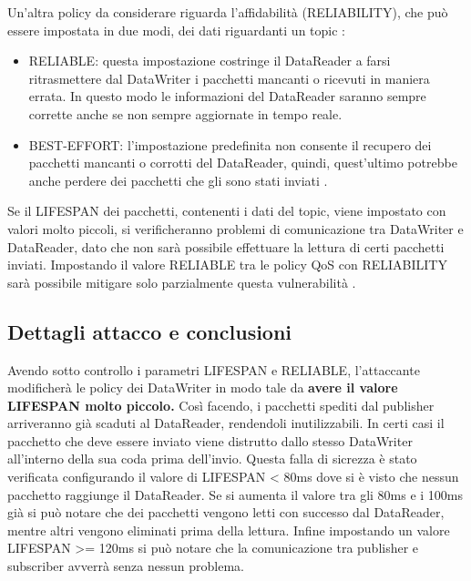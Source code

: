 Un'altra policy da considerare riguarda l'affidabilità (RELIABILITY),
che può essere impostata in due
modi, dei dati riguardanti un topic :
\begin{itemize}
    \item RELIABLE: questa impostazione costringe il DataReader a farsi
    ritrasmettere dal DataWriter i pacchetti mancanti o ricevuti in maniera errata.
    In questo modo le informazioni del DataReader saranno sempre corrette anche
    se non sempre aggiornate in tempo reale.
    \item BEST-EFFORT: l'impostazione predefinita non consente il recupero
    dei pacchetti mancanti o corrotti
    del DataReader, quindi, quest'ultimo potrebbe anche perdere dei pacchetti 
    che gli sono stati inviati \cite{dds1.4}.
\end{itemize}
Se il LIFESPAN dei pacchetti, contenenti i dati del topic,
viene impostato con valori molto piccoli, si verificheranno problemi di comunicazione
tra DataWriter e DataReader, dato che non sarà possibile effettuare la lettura di 
certi pacchetti inviati. Impostando il valore RELIABLE tra le policy QoS con
RELIABILITY sarà possibile mitigare 
solo parzialmente questa vulnerabilità
\cite{DBLP:conf/malware/MichaudDL18}.



\subsection{Dettagli attacco e conclusioni}
Avendo sotto controllo i parametri LIFESPAN e RELIABLE, l'attaccante modificherà le
policy dei DataWriter in modo tale da \textbf{avere il valore LIFESPAN molto piccolo.} 
Così
facendo, i pacchetti spediti dal publisher 
arriveranno già scaduti al DataReader,
rendendoli inutilizzabili. In certi casi il pacchetto che deve essere inviato
viene distrutto dallo stesso DataWriter 
all'interno della sua coda prima dell'invio. 
Questa falla di sicrezza è stato verificata configurando il valore di
LIFESPAN < 80ms dove si è visto che nessun pacchetto raggiunge il DataReader.
Se si aumenta il valore tra gli 80ms e i 100ms già si 
può notare che dei pacchetti
vengono letti con successo dal DataReader, mentre altri vengono eliminati prima
della lettura. Infine impostando un valore LIFESPAN >= 120ms si può notare che
la comunicazione tra publisher e subscriber avverrà senza nessun problema.

